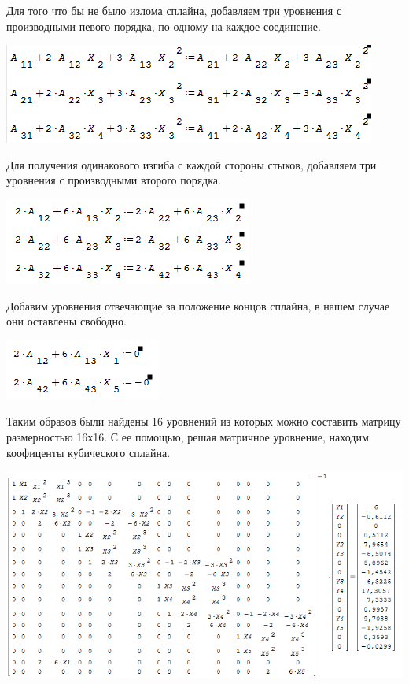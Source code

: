 \documentclass[russian,utf8,nocolumnxxxi,nocolumnxxxii]{eskdtext}
\begin{document}
\par
\newpage
\normalsize
Для того что бы не было излома сплайна, добавляем три уровнения с производными певого порядка, по одному на каждое соединение.
\begin{center}\includegraphics[scale=0.8]{2019-01-09_03-26-45}\end{center}
\par
\normalsize
Для получения одинакового изгиба с каждой стороны стыков, добавляем три уровнения с производными второго порядка.
\begin{center}\includegraphics[scale=0.8]{2019-01-09_03-31-08}\end{center}
\par
\normalsize
Добавим уровнения отвечающие за положение концов сплайна, в нашем случае они оставлены свободно.
\begin{center}\includegraphics[scale=0.8]{2019-01-09_03-34-49}\end{center}
\newpage
\par
\normalsize
Таким образов были найдены 16 уровнений из которых можно составить матрицу размерностью 16х16. С ее помощью, решая матричное уровнение, находим коофиценты кубического сплайна.
\begin{center}\includegraphics[scale=0.8]{29}\end{center}
\end{document}
